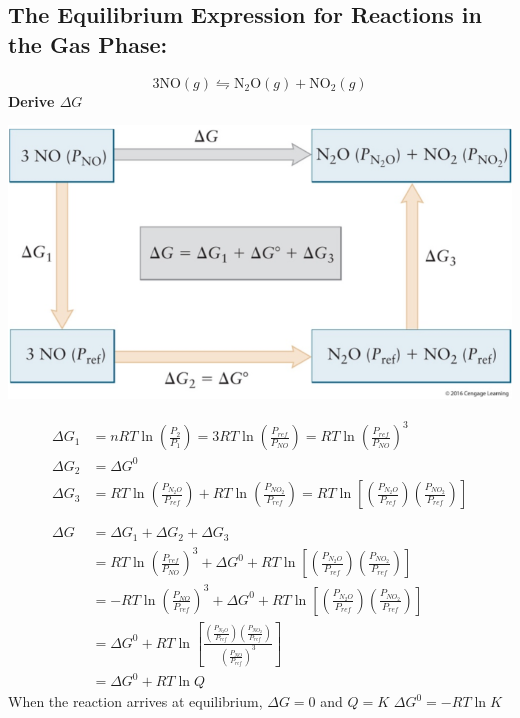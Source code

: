 \documentclass[10pt]{article}
\begin{document}
\subsection*{The Equilibrium Expression for Reactions in the Gas Phase:}
\[3 \text{NO}(g) \leftrightharpoons \text{N}_2\text{O}(g) + \text{NO}_2(g)\]
\textbf{Derive $\Delta G$}
\begin{center}
    \includegraphics*[scale=0.8]{W6_2.png}
\end{center}
\begin{align*}
    \Delta G_1 &= nRT\ln\left(\frac{P_2}{P_1}\right) = 3RT\ln\left(\frac{P_{ref}}{P_{NO}}\right) = RT\ln\left(\frac{P_{ref}}{P_{NO}}\right)^3\\
    \Delta G_2 &= \Delta G^0\\
    \Delta G_3 &= RT\ln\left(\frac{P_{N_2 O}}{P_{ref}}\right) + RT\ln\left(\frac{P_{NO_2}}{P_{ref}}\right) = RT\ln \left[\left(\frac{P_{N_2 O}}{P_{ref}}\right)\left(\frac{P_{NO_2}}{P_{ref}}\right)\right]\\
\\
\\
    \Delta G &= \Delta G_1 + \Delta G_2 + \Delta G_3\\
    &= RT\ln \left(\frac{P_{ref}}{P_{NO}}\right)^3 + \Delta G^0 + RT\ln\left[ \left(\frac{P_{N_2 O}}{P_{ref}}\right)\left(\frac{P_{NO_2}}{P_{ref}}\right)\right]\\
    &= -RT\ln \left(\frac{P_{NO}}{P_{ref}}\right)^3 + \Delta G^0 + RT\ln\left[ \left(\frac{P_{N_2 O}}{P_{ref}}\right)\left(\frac{P_{NO_2}}{P_{ref}}\right)\right]\\
    &= \Delta G^0 + RT\ln\left[\frac{\left(\frac{P_{N_2 O}}{P_{ref}}\right)\left(\frac{P_{NO_2}}{P_{ref}}\right)}{\left(\frac{P_{NO}}{P_{ref}}\right)^3}\right]\\
    &= \Delta G^0 + RT \ln Q
\end{align*}
When the reaction arrives at equilibrium, $\Delta G = 0$ and $Q = K$
$\Delta G^0 = -RT \ln K$
\end{document}

